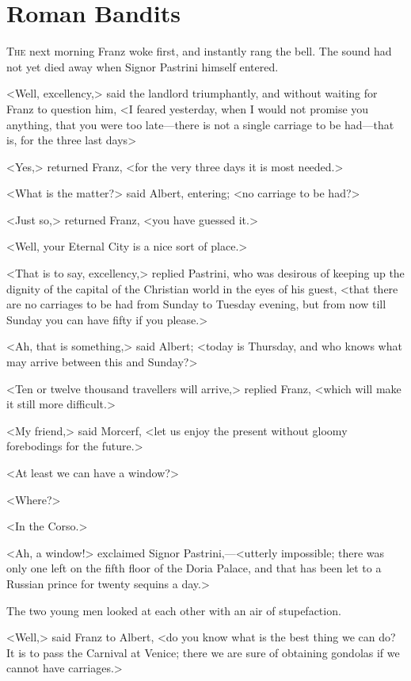 \chapter{Roman Bandits} 

 \lettrine{T}{he} next morning Franz woke first, and instantly rang the bell. The sound had not yet died away when Signor Pastrini himself entered. 

 <Well, excellency,> said the landlord triumphantly, and without waiting for Franz to question him, <I feared yesterday, when I would not promise you anything, that you were too late—there is not a single carriage to be had—that is, for the three last days> 

 <Yes,> returned Franz, <for the very three days it is most needed.> 

 <What is the matter?> said Albert, entering; <no carriage to be had?> 

 <Just so,> returned Franz, <you have guessed it.> 

 <Well, your Eternal City is a nice sort of place.> 

 <That is to say, excellency,> replied Pastrini, who was desirous of keeping up the dignity of the capital of the Christian world in the eyes of his guest, <that there are no carriages to be had from Sunday to Tuesday evening, but from now till Sunday you can have fifty if you please.> 

 <Ah, that is something,> said Albert; <today is Thursday, and who knows what may arrive between this and Sunday?> 

 <Ten or twelve thousand travellers will arrive,> replied Franz, <which will make it still more difficult.> 

 <My friend,> said Morcerf, <let us enjoy the present without gloomy forebodings for the future.> 

 <At least we can have a window?> 

 <Where?> 

 <In the Corso.> 

 <Ah, a window!> exclaimed Signor Pastrini,—<utterly impossible; there was only one left on the fifth floor of the Doria Palace, and that has been let to a Russian prince for twenty sequins a day.> 

 The two young men looked at each other with an air of stupefaction. 

 <Well,> said Franz to Albert, <do you know what is the best thing we can do? It is to pass the Carnival at Venice; there we are sure of obtaining gondolas if we cannot have carriages.> 

